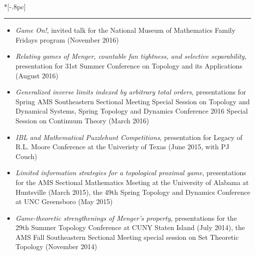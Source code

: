 \documentclass{article}
\newcommand{\headerText}[1]{
  \noindent{\large \bf #1} \\*[-.8pc]
  \rule{\textwidth}{.1pt}}
\begin{document}
\headerText{Selected Presentations}
\begin{itemize}
  \item
    \emph{Game On!},
    invited talk for the
      National Museum of Mathematics Family Fridays program
      (November 2016)
  \item
    \emph{Relating games of Menger, countable fan tightness, and selective separability},
    presentation for
       31st Summer Conference on Topology and its Applications
      (August 2016)
  \item
    \emph{Generalized inverse limits indexed by arbitrary total orders},
    presentations for
      Spring AMS Southeastern Sectional Meeting Special Session on Topology and Dynamical Systems,
      Spring Topology and Dynamics Conference 2016 Special Session on Continuum Theory
      (March 2016)
  \item
    \emph{IBL and Mathematical Puzzlehunt Competitions},
    presentation for
      Legacy of R.L. Moore Conference at the Univeristy of Texas
      (June 2015, with PJ Couch)
  \item
    \emph{Limited information strategies for a topological proximal game},
    presentations for
      the AMS Sectional Mathematics Meeting at the University of
      Alabama at Huntsville (March 2015),
      the 49th Spring Topology and Dynamics Conference at
      UNC Greensboro (May 2015)
  \item
    \emph{Game-theoretic strengthenings of Menger's property},
    presentations for
      the 29th Summer Topology Conference at CUNY Staten Island (July 2014),
      the AMS Fall Southeastern Sectional Meeting special session on Set
      Theoretic Topology (November 2014)

\end{itemize}
\end{document}
